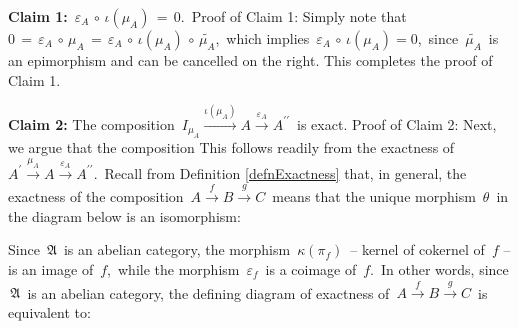 \begin{enumerate}
	\vskip 0.3cm
	\textbf{Claim 1:}\;
	\,$\varepsilon_{A} \,\circ\, \iota(\mu_{A}) \,=\, 0$.\,
	\vskip 0.01cm
	Proof of Claim 1:\; Simply note that
	\,$0 \,=\, \varepsilon_{A} \,\circ\, \mu_{A} \,=\,\varepsilon_{A} \,\circ\, \iota(\mu_{A}) \,\circ\, \widetilde{\mu_{A}}$,\,
	which implies
	\,$\varepsilon_{A} \,\circ\, \iota(\mu_{A}) = 0$,\,
	since \,$\widetilde{\mu_{A}}$\, is an epimorphism and can be cancelled on the right.
	This completes the proof of Claim 1.	


	\vskip 0.3cm
	\textbf{Claim 2:}\;
	The composition
	\,$I_{\mu_{A}} \overset{\iota(\mu_{A})}{\longrightarrow} A \overset{\varepsilon_{A}}{\longrightarrow} A^{\prime\prime}$\,
	is exact.
	\vskip 0.01cm
	Proof of Claim 2:\;
	Next, we argue that the composition
	This follows readily from the exactness of
	\,$A^{\prime} \overset{\mu_{A}}{\longrightarrow} A \overset{\varepsilon_{A}}{\longrightarrow} A^{\prime\prime}$.\,
	Recall from Definition \ref{defnExactness} that, in general, the exactness of the composition
	\,$A \overset{f}{\longrightarrow} B \overset{g}{\longrightarrow} C$\,
	means that the unique morphism \,$\theta$\, in the diagram below is an isomorphism:
	\begin{center}
	\end{center}
	Since \,$\mathfrak{A}$\, is an abelian category,
	the morphism \,$\kappa(\pi_{f})$\, -- kernel of cokernel of \,$f$ --
	is an image of \,$f$,\,
	while the morphism \,$\varepsilon_{f}$\, is a coimage of \,$f$.\,
	In other words, since \,$\mathfrak{A}$\, is an abelian category,
	the defining diagram of exactness of
	\,$A \overset{f}{\longrightarrow} B \overset{g}{\longrightarrow} C$\,
	is equivalent to:
	\begin{center}
\end{center}
\end{enumerate}
